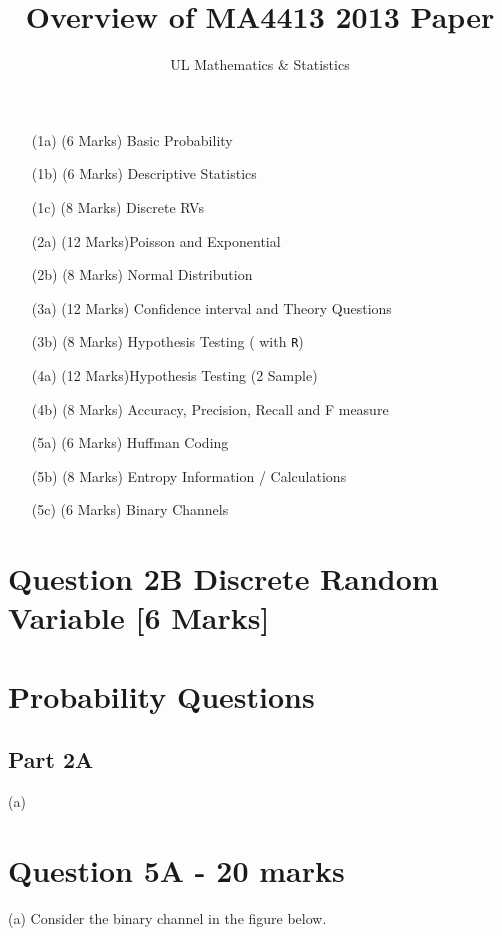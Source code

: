 \documentclass[]{article}
\title{Overview of MA4413 2013 Paper}
\author{UL Mathematics \& Statistics}
\begin{document}
\maketitle

\begin{itemize}
\item[(1a)] (6 Marks) Basic Probability
\item[(1b)] (6 Marks) Descriptive Statistics
\item[(1c)] (8 Marks) Discrete RVs
\item[(2a)] (12 Marks)Poisson and Exponential
\item[(2b)] (8 Marks) Normal Distribution
\item[(3a)] (12 Marks) Confidence interval and Theory Questions
\item[(3b)] (8 Marks) Hypothesis Testing ( with \texttt{R})
\item[(4a)] (12 Marks)Hypothesis Testing (2 Sample)
\item[(4b)] (8 Marks) Accuracy, Precision, Recall and F measure
\item[(5a)] (6 Marks) Huffman Coding
\item[(5b)] (8 Marks) Entropy Information / Calculations
\item[(5c)] (6 Marks) Binary Channels
\end{itemize}
\newpage
\section*{Question 2B Discrete Random Variable [6 Marks]}



\newpage
\section{Probability Questions}
\subsection*{Part 2A}

(a)										       

\newpage
\section*{Question 5A - 20 marks}
(a) Consider the binary channel in the figure below.
\end{document}
